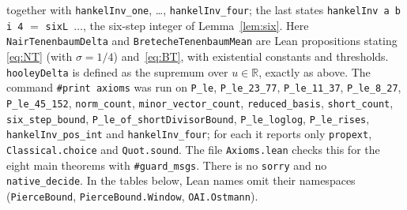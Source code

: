 \documentclass[11pt]{amsart}
\theoremstyle{definition}
\theoremstyle{remark}
\newcommand{\lean}[1]{\texttt{#1}}
\begin{document}
\begin{sloppypar}\noindent
together with \lean{hankelInv\_one}, \dots, \lean{hankelInv\_four}; the last states
\lean{hankelInv a b i 4} $=$ \lean{sixL $\dots$}, the six-step integer of
Lemma~\ref{lem:six}.
Here \lean{NairTenenbaumDelta} and \lean{BretecheTenenbaumMean} are Lean propositions stating
\eqref{eq:NT} (with $\sigma=1/4$) and~\eqref{eq:BT}, with existential constants and
thresholds. \lean{hooleyDelta} is defined as the supremum over $u\in\mathbb R$, exactly as
above. The command \lean{\#print axioms} was run on \lean{P\_le}, \lean{P\_le\_23\_77},
\lean{P\_le\_11\_37}, \lean{P\_le\_8\_27}, \lean{P\_le\_45\_152}, \lean{norm\_count},
\lean{minor\_vector\_count}, \lean{reduced\_basis}, \lean{short\_count},
\lean{six\_step\_bound},
\lean{P\_le\_of\_shortDivisorBound}, \lean{P\_le\_loglog}, \lean{P\_le\_rises}, \lean{hankelInv\_pos\_int} and
\lean{hankelInv\_four}; for each it reports only \lean{propext},
\lean{Classical.choice} and \lean{Quot.sound}. The file \lean{Axioms.lean} checks this for the
eight main theorems with \lean{\#guard\_msgs}. There is no \lean{sorry} and no
\lean{native\_decide}. In the tables below, Lean names omit their namespaces
(\lean{PierceBound}, \lean{PierceBound.Window}, \lean{OAI.Ostmann}).
\end{sloppypar}
\end{document}
